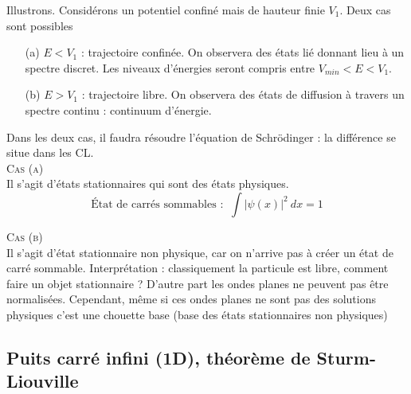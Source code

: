Illustrons. Considérons un potentiel confiné mais de hauteur finie $V_1$. Deux cas sont possibles
\begin{enumerate}
\item[(a)] $E<V_1$ : trajectoire confinée. On observera des états lié donnant lieu à un spectre discret. 
Les niveaux d'énergies seront compris entre $V_{min}<E<V_1$.
\item[(b)] $E>V_1$ : trajectoire libre. On observera des états de diffusion à travers un spectre continu :
continuum d'énergie.
\end{enumerate}
Dans les deux cas, il faudra résoudre l'équation de Schrödinger : la différence se situe dans les CL. \\

\textsc{Cas (a)}\\
Il s'agit d'états stationnaires qui sont des états physiques.
\begin{equation}
\text{État de carrés sommables : }\ \int |\psi(x)|^2\ dx = 1
\end{equation}

\textsc{Cas (b)}\\
Il s'agit d'état stationnaire non physique, car on n'arrive pas à créer un état de 
carré sommable. Interprétation : classiquement la particule est libre, comment 
faire un objet stationnaire ? D'autre part les ondes planes ne peuvent pas 
être normalisées. Cependant, même si ces ondes planes ne sont pas des solutions physiques 
c'est une chouette base (base des états stationnaires non physiques)\\

\subsection{Puits carré infini (1D), théorème de Sturm-Liouville}
